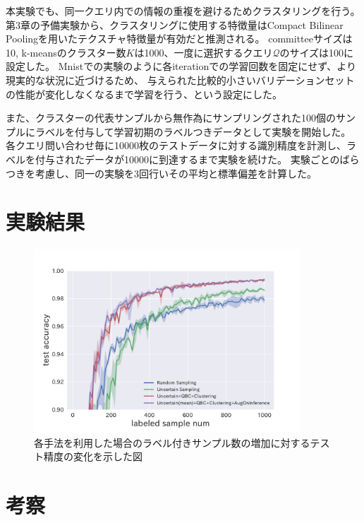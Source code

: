 本実験でも、同一クエリ内での情報の重複を避けるためクラスタリングを行う。
第3章の予備実験から、クラスタリングに使用する特徴量はCompact Bilinear Poolingを用いたテクスチャ特徴量が有効だと推測される。
committeeサイズは10, k-meansのクラスター数$K$は1000、一度に選択するクエリ$\mathcal{Q}$のサイズは100に設定した。
Mnistでの実験のように各iterationでの学習回数を固定にせず、より現実的な状況に近づけるため、
与えられた比較的小さいバリデーションセットの性能が変化しなくなるまで学習を行う、という設定にした。

また、クラスターの代表サンプルから無作為にサンプリングされた100個のサンプルにラベルを付与して学習初期のラベルつきデータとして実験を開始した。
各クエリ問い合わせ毎に10000枚のテストデータに対する識別精度を計測し、ラベルを付与されたデータが10000に到達するまで実験を続けた。
実験ごとのばらつきを考慮し、同一の実験を3回行いその平均と標準偏差を計算した。

\section{実験結果}

\begin{figure}[tbp]
    \label{fig:mnist_acc_graph}
     \begin{center}
      \includegraphics[width=10cm]{figures/mnist_acc_graph.pdf}
     \end{center}
    \caption{各手法を利用した場合のラベル付きサンプル数の増加に対するテスト精度の変化を示した図}
\end{figure}

\section{考察}
